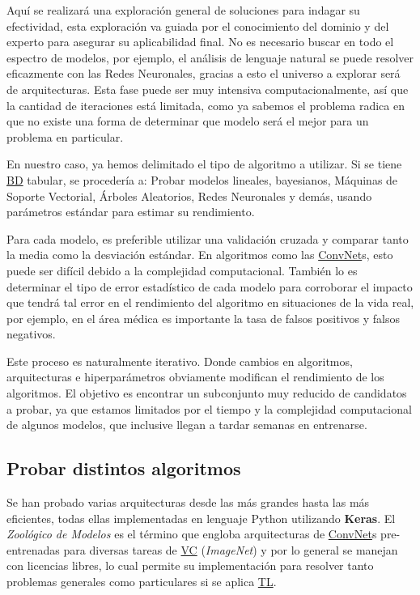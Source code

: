 
Aquí se realizará una exploración general de soluciones para indagar su
efectividad, esta exploración va guiada por el conocimiento del dominio y del
experto para asegurar su aplicabilidad final. No es necesario buscar en todo el
espectro de modelos, por ejemplo, el análisis de lenguaje natural se puede
resolver eficazmente con las Redes Neuronales,  gracias a esto el universo a
explorar será de arquitecturas. Esta fase puede ser muy intensiva
computacionalmente, así que la cantidad de iteraciones está limitada, como ya
sabemos el problema radica en que no existe una forma de determinar que modelo
será el mejor para un problema en particular.

En nuestro caso, ya hemos delimitado el tipo de algoritmo a utilizar. Si se
tiene \hyperlink{abbr}{BD} tabular, se procedería a: Probar modelos lineales,
bayesianos, Máquinas de Soporte Vectorial, Árboles Aleatorios, Redes Neuronales
y demás, usando parámetros estándar para estimar su rendimiento.

Para cada modelo, es preferible utilizar una validación cruzada y comparar tanto
la media como la desviación estándar. En algoritmos como las
\hyperlink{abbr}{ConvNet}s, esto puede ser difícil debido a la complejidad
computacional. También lo es determinar el tipo de error estadístico de cada
modelo para corroborar el impacto que tendrá tal error en el rendimiento del
algoritmo en situaciones de la vida real, por ejemplo, en el área médica es
importante la tasa de falsos positivos y falsos negativos.

Este proceso es naturalmente iterativo. Donde cambios en algoritmos,
arquitecturas e hiperparámetros obviamente modifican el rendimiento de los
algoritmos. El objetivo es encontrar un subconjunto muy reducido de candidatos a
probar, ya que estamos limitados por el tiempo y la complejidad computacional de
algunos modelos, que inclusive llegan a tardar semanas en entrenarse.

\subsection{Probar distintos algoritmos}

Se han probado varias arquitecturas desde las más grandes hasta las más
eficientes, todas ellas implementadas en lenguaje Python utilizando
\textbf{Keras}. El \emph{Zoológico de Modelos} es el término que engloba
arquitecturas de \hyperlink{abbr}{ConvNet}s pre-entrenadas para diversas tareas
de \hyperlink{abbr}{VC} (\emph{ImageNet}) y por lo general se manejan con
licencias libres, lo cual permite su implementación para resolver tanto
problemas generales como particulares si se aplica \hyperlink{abbr}{TL}.

